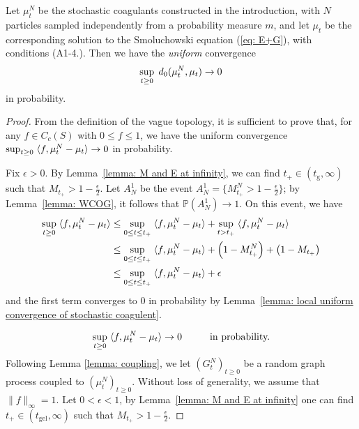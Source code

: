 \begin{lemma} \label{lemma: uniform convergence of coagulant} Let $\mu^N_t$ be the stochastic coagulants constructed in the introduction, with $N$ particles sampled independently from a probability measure $m$, and let $\mu_t$ be the corresponding solution to the Smoluchowski equation (\ref{eq: E+G}), with conditions (A1-4.). Then we have the \emph{uniform} convergence \begin{equation} \sup_{t\ge 0} \hspace{0.1cm} d_0(\mu^N_t, \mu_t) \rightarrow 0\end{equation} in probability.  \end{lemma} 
\begin{proof} 

From the definition of the vague topology, it is sufficient to prove that, for any $f\in C_c(S)$ with $0\leq f \leq 1$, we have the uniform convergence
$\sup_{t\geq 0}\hspace{0.1cm} \langle f, \mu^N_t-\mu_t \rangle \rightarrow 0$ in probability.

Fix $\epsilon>0$. By Lemma~\ref{lemma: M and E at infinity}, we can find $t_+\in (t_\text{g}, \infty)$ such that $M_{t_+}>1-\frac{\epsilon}{2}.$
Let $A^1_N$ be the event $A^1_N=\{M^N_{t_+}>1-\frac{\epsilon}{2} \}$; by Lemma~\ref{lemma: WCOG}, it follows that $\mathbb{P}(A^1_N)\rightarrow 1$.
On this event, we have
\begin{equation} \begin{split}
\sup_{t\geq 0}\hspace{0.1cm} \langle f, \mu^N_t-\mu_t \rangle
&\leq
\sup_{0 \leq t \leq t_+}\hspace{0.1cm} \langle f, \mu^N_t-\mu_t \rangle + \sup_{t >t_+}\hspace{0.1cm} \langle f, \mu^N_t-\mu_t \rangle \\ &
\leq
\sup_{0 \leq t \leq t_+}\hspace{0.1cm} \langle f, \mu^N_t-\mu_t \rangle + \left(1 - M_{t_+}^N\right) + \left(1 - M_{t_+}\right)
\\ & \leq
\sup_{0 \leq t \leq t_+}\hspace{0.1cm} \langle f, \mu^N_t-\mu_t \rangle + \epsilon
\end{split} \end{equation}
and the first term converges to $0$ in probability by Lemma~\ref{lemma: local uniform convergence of stochastic coagulent}.

\iffalse
\begin{equation}
    \sup_{t\geq 0}\hspace{0.1cm} \langle f, \mu^N_t-\mu_t \rangle \rightarrow 0 \hspace{1cm} \text{in probability.}
\end{equation} Following Lemma \ref{lemma: coupling}, we let $(G^N_t)_{t\ge 0}$ be a random graph process coupled to $(\mu^N_t)_{t\ge 0}$. Without loss of generality, we assume that $\|f\|_\infty=1.$
Let $0<\epsilon<1$, by Lemma~\ref{lemma: M and E at infinity} one can find $t_+\in (t_\text{gel}, \infty)$ such that $M_{t_+}>1-\frac{\epsilon}{2}.$


\end{proof}
